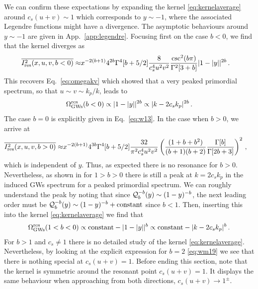 \documentclass[a4paper,11pt]{article}
\numberwithin{equation}{section}
\begin{document}
We can confirm these expectations by expanding the kernel \eqref{eq:kernelaverage} around $c_s(u+v)\sim 1$ which corresponds to $y\sim -1$, where the associated Legendre functions might have a divergence. The asymptotic behaviours around $y\sim -1$ are given in App.~\ref{app:legendre}. Focusing first on the case $b<0$, we find that the kernel diverges as
\begin{align}\label{eq:kernelresbneg}
\overline{I_{\rm res}^2(x,u,v,b<0)}\approx&x^{-2(b+1)} 4^{2b}\Gamma^4[b+5/2]\frac{8}{c_s^4 u^2v^2}\frac{\csc^2(b\pi)}{\Gamma^2[3+b]}|1-|y||^{2b}\,.
\end{align}
This recovers Eq.~\eqref{eq:omegakv} which showed that a very peaked primordial spectrum, so that $u\sim v\sim k_p/k$, leads to
\begin{align}
\Omega^{\rm res}_{\rm GWs}(b<0)\propto |1-|y||^{2b}\propto |k-2c_sk_p|^{2b}\,.
\end{align}
The case $b=0$ is explicitly given in Eq.~\eqref{eq:w13}.
In the case when $b>0$, we arrive at
\begin{align}\label{eq:kernelresbpos}
\overline{I_{\rm res}^2(x,u,v,b>0)}\approx &x^{-2(b+1)} 4^{3b}\Gamma^4[b+5/2]\frac{32}{\pi^2c_s^4 u^2v^2}
\left(\frac{(1+b+b^2)}{(b+1)(b+2)}\frac{\Gamma[b]}{\Gamma[2b+3]}\right)^2\,,
\end{align}
which is independent of $y$. Thus, as expected there is no resonance for $b>0$. Nevertheless, as shown in \cite{Domenech:2019quo} for $1>b>0$ there is still a peak at $k=2c_sk_p$ in the induced GWs spectrum for a peaked primordial spectrum. We can roughly understand the peak by noting that since ${\cal Q}^{-b}_{b}(y)\sim (1-y)^{-b}$, the next leading order must be ${\cal Q}^{-b}_{b}(y)\sim (1-y)^{-b}+{\rm constant}$ since $b<1$. Then, inserting this into the kernel \eqref{eq:kernelaverage} we find that
\begin{align}
\Omega^{\rm res}_{\rm GWs}(1<b<0)\propto {\rm constant}-|1-|y||^{b}\propto {\rm constant}-|k-2c_sk_p|^{b}\,.
\end{align}
For $b>1$ and $c_s\neq1$ there is no detailed study of the kernel \eqref{eq:kernelaverage}. Nevertheless, by looking at the explicit expression for $b=2$ \eqref{eq:wm19} we see that there is nothing special at $c_s(u+v)=1$. Before ending this section, note that the kernel is symmetric around the resonant point $c_s(u+v)=1$. It displays the same behaviour when approaching from both directions, $c_s(u+v)\to1^{\pm}$.
\end{document}
